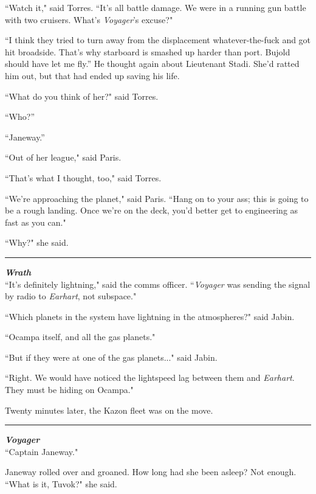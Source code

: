 \documentclass[twoside,letterpaper,12pt]{memoir}
\begin{document}
``Watch it," said Torres. ``It’s all battle damage. We were in a running gun battle with two cruisers. What's \textit{Voyager}'s excuse?"

``I think they tried to turn away from the displacement whatever-the-fuck and got hit broadside. That’s why starboard is smashed up harder than port. Bujold should have let me fly.” He thought again about Lieutenant Stadi. She’d ratted him out, but that had ended up saving his life.

``What do you think of her?" said Torres.

“Who?”

“Janeway.”

``Out of her league," said Paris.

``That's what I thought, too," said Torres.

``We're approaching the planet," said Paris. ``Hang on to your ass; this is going to be a rough landing. Once we're on the deck, you'd better get to engineering as fast as you can."

``Why?" she said.

\begin{center}\rule{3cm}{0.4 pt}\end{center}

\noindent\textit{\textbf{Wrath}}\\

``It's definitely lightning," said the comms officer. ``\textit{Voyager} was sending the signal by radio to \textit{Earhart}, not subspace."

``Which planets in the system have lightning in the atmospheres?" said Jabin.

``Ocampa itself, and all the gas planets."

``But if they were at one of the gas planets..." said Jabin.

``Right. We would have noticed the lightspeed lag between them and \textit{Earhart}. They must be hiding on Ocampa."

Twenty minutes later, the Kazon fleet was on the move.

\begin{center}\rule{3cm}{0.4 pt}\end{center}

\noindent\textit{\textbf{Voyager}}\\

``Captain Janeway."

Janeway rolled over and groaned. How long had she been asleep? Not enough. ``What is it, Tuvok?" she said.
\end{document}
